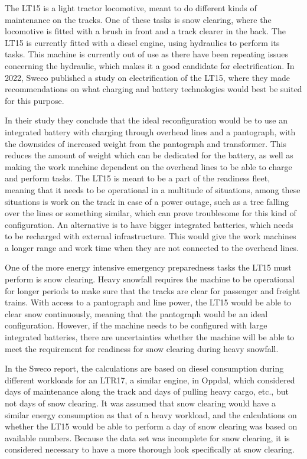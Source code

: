 \documentclass{article}
\begin{document}
The LT15 is a light tractor locomotive, meant to do different kinds of maintenance on the tracks. One of these tasks is snow clearing, where the locomotive is fitted with a brush in front and a track clearer in the back. The LT15 is currently fitted with a diesel engine, using hydraulics to perform its tasks. This machine is currently out of use as there have been repeating issues concerning the hydraulic, which makes it a good candidate for electrification. In 2022, Sweco published a study on electrification of the LT15, where they made recommendations on what charging and battery technologies would best be suited for this purpose.

In their study they conclude that the ideal reconfiguration would be to use an integrated battery with charging through overhead lines and a pantograph, with the downsides of increased weight from the pantograph and transformer. This reduces the amount of weight which can be dedicated  for the battery, as well as making the work machine dependent on the overhead lines to be able to charge and perform tasks. The LT15 is meant to be a part of the readiness fleet, meaning that it needs to be operational in a multitude of situations, among these situations is work on the track in case of a power outage, such as a tree falling over the lines or something similar, which can prove troublesome for this kind of configuration. An alternative is to have bigger integrated batteries, which needs to be recharged with external infrastructure. This would give the work machines a longer range and work time when they are not connected to the overhead lines. 

One of the more energy intensive emergency preparedness tasks the LT15 must perform is snow clearing. Heavy snowfall requires the machine to be operational for longer periods to make sure that the tracks are clear for passenger and freight trains. With access to a pantograph and line power, the LT15 would be able to clear snow continuously, meaning that the pantograph would be an ideal configuration. However, if the machine needs to be configured with large integrated batteries, there are uncertainties whether the machine will be able to meet the requirement for readiness for snow clearing during heavy snowfall.

In the Sweco report, the calculations are based on diesel consumption during different workloads for an LTR17, a similar engine, in Oppdal, which considered days of maintenance along the track and days of pulling heavy cargo, etc., but not days of snow clearing. It was assumed that snow clearing would have a similar energy consumption as that of a heavy workload, and the calculations on whether the LT15 would be able to perform a day of snow clearing was based on available numbers. Because the data set was incomplete for snow clearing, it is considered necessary to have a more thorough look specifically at snow clearing.
\end{document}
